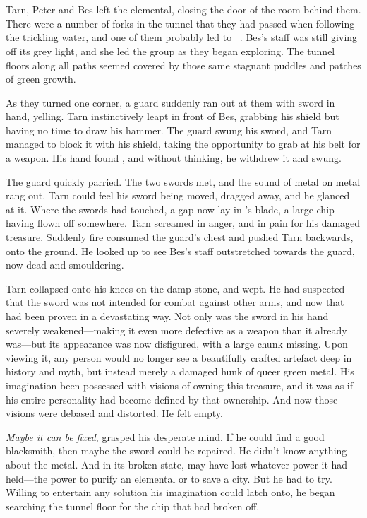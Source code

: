 \chapter{\mothzam\ \driktur}

Tarn, Peter and Bes left the elemental, closing the door of the room behind them.  There were a number of forks in the tunnel that they had passed when following the trickling water, and one of them probably led to \mothzam\ \driktur.  Bes's staff was still giving off its grey light, and she led the group as they began exploring.  The tunnel floors along all paths seemed covered by those same stagnant puddles and patches of green growth.

As they turned one corner, a guard suddenly ran out at them with sword in hand, yelling.  Tarn instinctively leapt in front of Bes, grabbing his shield but having no time to draw his hammer.    The guard swung his sword, and Tarn managed to block it with his shield, taking the opportunity to grab at his belt for a weapon.  His hand found \kildir, and without thinking, he withdrew it and swung.

The guard quickly parried.  The two swords met, and the sound of metal on metal rang out.  Tarn could feel his sword being moved, dragged away, and he glanced at it.  Where the swords had touched, a gap now lay in \kildir's blade, a large chip having flown off somewhere.  Tarn screamed in anger, and in pain for his damaged treasure.  Suddenly fire consumed the guard's chest and pushed Tarn backwards, onto the ground.  He looked up to see Bes's staff outstretched towards the guard, now dead and smouldering.

Tarn collapsed onto his knees on the damp stone, and wept.  He had suspected that the sword was not intended for combat against other arms, and now that had been proven in a devastating way.   Not only was the sword in his hand severely weakened---making it even more defective as a weapon than it already was---but its appearance was now disfigured, with a large chunk missing.  Upon viewing it, any person would no longer see a beautifully crafted artefact deep in history and myth, but instead merely a damaged hunk of queer green metal.  His imagination been possessed with visions of owning this treasure, and it was as if his entire personality had become defined by that ownership.  And now those visions were debased and distorted.  He felt empty.

\emph{Maybe it can be fixed}, grasped his desperate mind.  If he could find a good blacksmith, then maybe the sword could be repaired.  He didn't know anything about the metal.  And in its broken state, \kildir may have lost whatever power it had held---the power to purify an elemental or to save a city.  But he had to try.  Willing to entertain any solution his imagination could latch onto, he began searching the tunnel floor for the chip that had broken off.


